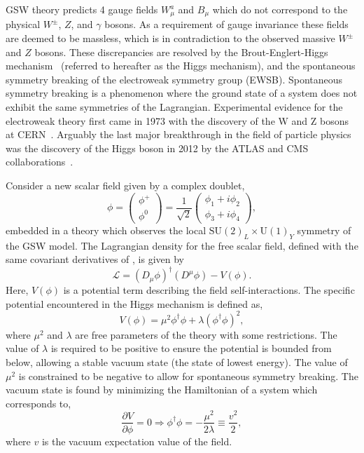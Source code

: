 GSW theory predicts 4 gauge fields $W^a_\mu$ and $B_\mu$ which do not correspond to the physical $W^\pm$, $Z$, and $\gamma$ bosons.
As a requirement of gauge invariance these fields are deemed to be massless, which is in contradiction to the observed massive $W^\pm$ and $Z$ bosons.
These discrepancies are resolved by the Brout-Englert-Higgs mechanism~\cite{Higgs1, Higgs2, Higgs3} (referred to hereafter as the Higgs mechanism), and the spontaneous symmetry breaking of the electroweak symmetry group (EWSB).
Spontaneous symmetry breaking is a phenomenon where the ground state of a system does not exhibit the same symmetries of the Lagrangian.
Experimental evidence for the electroweak theory first came in 1973 with the discovery of the W and Z bosons at CERN\@~\cite{WZ, ObservationNeutrinolikeInteractions}.
Arguably the last major breakthrough in the field of particle physics was the discovery of the Higgs boson in 2012 by the ATLAS and CMS collaborations~\cite{ATLASHiggs, CMSHiggs}.

Consider a new scalar field given by a complex doublet,
\begin{equation}
    \phi = \begin{pmatrix} \phi^+ \\ \phi^0 \end{pmatrix} = \frac{1}{\sqrt{2}} \begin{pmatrix} \phi_1 + i \phi_2 \\ \phi_3 + i \phi_4 \end{pmatrix},
\end{equation}
embedded in a theory which observes the local $\text{SU}(2)_L \times \text{U}(1)_Y$ symmetry of the GSW model.
The Lagrangian density for the free scalar field, defined with the same covariant derivatives of , is given by
\begin{equation}
    \label{eq:higgs_lagrangian}
    \mathcal{L} = (D_\mu \phi)^\dagger (D^\mu \phi) - V(\phi).
\end{equation}
Here, $V(\phi)$ is a potential term describing the field self-interactions.
The specific potential encountered in the Higgs mechanism is defined as,
\begin{equation}
    \label{eq:higgs_potential}
    V(\phi) = \mu^2 \phi^\dagger \phi + \lambda (\phi^\dagger \phi)^2,
\end{equation}
where $\mu^2$ and $\lambda$ are free parameters of the theory with some restrictions.
The value of $\lambda$ is required to be positive to ensure the potential is bounded from below, allowing a stable vacuum state (the state of lowest energy).
The value of $\mu^2$ is constrained to be negative to allow for spontaneous symmetry breaking.
The vacuum state is found by minimizing the Hamiltonian of a system which corresponds to,
\begin{equation}
    \frac{\partial V}{\partial \phi} = 0 \Longrightarrow  \phi^\dagger \phi = -\frac{\mu^2}{2\lambda} \equiv \frac{v^2}{2},
\end{equation}
where $v$ is the vacuum expectation value of the field.

